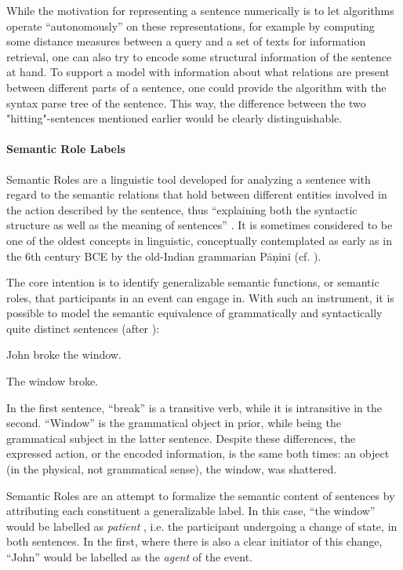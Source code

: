 While the motivation for representing a sentence numerically is to let algorithms operate
``autonomously'' on these representations, for example by computing some distance measures
between a query and a set of texts for information retrieval, one can also try to encode
some structural information of the sentence at hand. To support a model with information
about what relations are present between different parts of a sentence, one could provide
the algorithm with the syntax parse tree of the sentence. This way, the difference between
the two "hitting"-sentences mentioned earlier would be clearly distinguishable.

\paragraph*{Semantic Role Labels}

Semantic Roles are a linguistic tool developed for analyzing a sentence with regard to the
semantic relations that hold between different entities involved in the action described by
the sentence, thus ``explaining both the syntactic structure as well as the meaning of sentences''
\cite{bussmann2006routledge}. It is sometimes considered to be one of the oldest concepts in
linguistic, conceptually contemplated as early as in the 6th century BCE by the old-Indian
grammarian P\=a\d{n}ini (cf. \citep{gildea2002automatic}).

The core intention is to identify generalizable semantic functions, or semantic roles,
that participants in an event can engage in. With such an instrument, it is possible to
model the semantic equivalence of grammatically and syntactically quite distinct sentences
(after \cite{palmer2010semantic}):

\begin{examples}
  \item John broke the window.
  \item The window broke.
\end{examples}

In the first sentence, ``break'' is a transitive verb, while it is intransitive in the second.
``Window'' is the grammatical object in prior, while being the grammatical subject in the latter
sentence. Despite these differences, the expressed action, or the encoded information, is the
same both times: an object (in the physical, not grammatical sense), the window, was shattered.

Semantic Roles are an attempt to formalize the semantic content of sentences by attributing each constituent
a generalizable label. In this case, ``the window'' would be labelled as \emph{patient}
, i.e. the participant undergoing a change of state, in both sentences.
In the first, where there is also a clear initiator of this change, ``John''
would be labelled as the \emph{agent} of the event.

